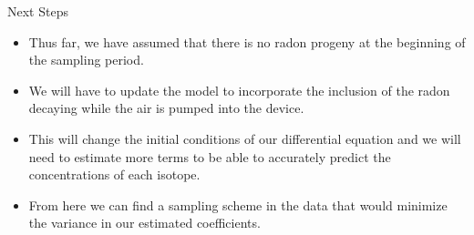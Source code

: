 \documentclass{beamer}
\begin{document}
\begin{frame}{Next Steps}
\begin{itemize}
    \item Thus far, we have assumed that there is no radon progeny at the beginning of the sampling period.
    \item  We will have to update the model to incorporate the inclusion of the radon decaying while the air is pumped into the device.
    \item This will change the initial conditions of our differential equation and we will need to estimate more terms to be able to accurately predict the concentrations of each isotope.
    \item From here we can find a sampling scheme in the data that would minimize the variance in our estimated coefficients.
\end{itemize}
    
\end{frame}
\end{document}
